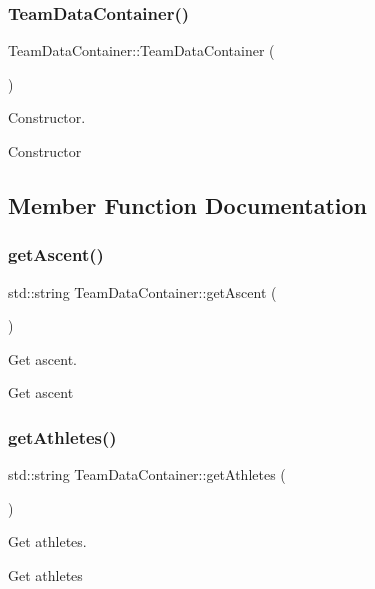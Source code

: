 \subsubsection{\texorpdfstring{TeamDataContainer()}{TeamDataContainer()}}
{\footnotesize\ttfamily Team\+Data\+Container\+::\+Team\+Data\+Container (\begin{DoxyParamCaption}{ }\end{DoxyParamCaption})}



Constructor. 

Constructor 

\subsection{Member Function Documentation}
\mbox{\label{classTeamDataContainer_ad4cdbb0a46c78363973fceab697f1032}} 
\subsubsection{\texorpdfstring{getAscent()}{getAscent()}}
{\footnotesize\ttfamily std\+::string Team\+Data\+Container\+::get\+Ascent (\begin{DoxyParamCaption}{ }\end{DoxyParamCaption})}



Get ascent. 

Get ascent \mbox{\label{classTeamDataContainer_a7093d9aed16e643f524462cc0e8ef8e5}} 
\subsubsection{\texorpdfstring{getAthletes()}{getAthletes()}}
{\footnotesize\ttfamily std\+::string Team\+Data\+Container\+::get\+Athletes (\begin{DoxyParamCaption}{ }\end{DoxyParamCaption})}



Get athletes. 

Get athletes \mbox{\label{classTeamDataContainer_a23f2fc37602f797d79181ddcb1a0f6ed}} 
